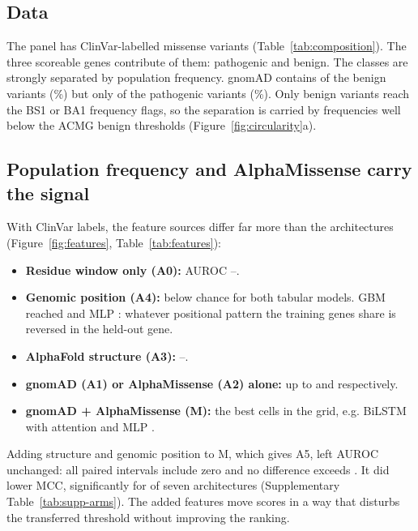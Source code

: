\documentclass[11pt]{article}
\newcommand{\gene}[1]{\textit{#1}}
\begin{document}
\subsection{Data}

The panel has \nLabelled{} ClinVar-labelled missense variants (Table~\ref{tab:composition}).
The three scoreable genes contribute \nLabelledScoreable{} of them: \nPathogenicScoreable{}
pathogenic and \nBenignScoreable{} benign. The classes are strongly separated by
population frequency. gnomAD contains \benignObserved{} of the \benignTotal{} benign
variants (\benignObservedPct\%) but only \pathObserved{} of the \pathTotal{} pathogenic
variants (\pathObservedPct\%). Only \benignBsOne{} benign variants reach the
BS1 or BA1 frequency flags, so the separation is carried by frequencies well below the
ACMG benign thresholds (Figure~\ref{fig:circularity}a).

\begin{table}[t]
\centering
\caption{\textbf{Variant table.} Missense substitutions per gene; ClinVar labels
($\geq$2 review stars), of which three-star expert-panel; DMS labels from the single
ProteinGym \gene{MSH2} assay; and how many labelled variants are observed in gnomAD.
$^{a}$\gene{PMS2} is not scoreable ($n<50$).}
\label{tab:composition}
\resizebox{\textwidth}{!}{}
\end{table}

\subsection{Population frequency and AlphaMissense carry the signal}

With ClinVar labels, the feature sources differ far more than the architectures
(Figure~\ref{fig:features}, Table~\ref{tab:features}):
\begin{itemize}
\item \textbf{Residue window only (A0):} AUROC \aucAZeroCnn--\aucAZeroTransformer{}.
\item \textbf{Genomic position (A4):} below chance for both tabular models. GBM reached
  \aucAFourGbm{} \aucCiAFourGbm{} and MLP \aucAFourMlp{} \aucCiAFourMlp: whatever
  positional pattern the training genes share is reversed in the held-out gene.
\item \textbf{AlphaFold structure (A3):} \aucAThreeCnn--\aucAThreeMlp.
\item \textbf{gnomAD (A1) or AlphaMissense (A2) alone:} up to \aucAOneMlp{} and
  \aucATwoMlp{} respectively.
\item \textbf{gnomAD + AlphaMissense (M):} the best cells in the grid, e.g. BiLSTM with
  attention \aucMBilstmAttn{} and MLP \aucMMlp.
\end{itemize}
Adding structure and genomic position to M, which gives A5, left AUROC unchanged: all
\nMVsAFiveAucNull{} paired intervals include zero and no difference exceeds
\maxAbsMVsAFiveAuc{}. It did lower MCC, significantly for \nMVsAFiveMccBetter{} of seven
architectures (Supplementary Table~\ref{tab:supp-arms}). The added features move scores
in a way that disturbs the transferred threshold without improving the ranking.
\end{document}
